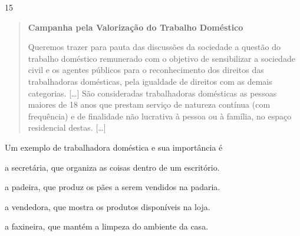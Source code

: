 
\num{15}

\begin{quote}
\textbf{Campanha pela Valorização do Trabalho Doméstico}

Queremos trazer para pauta das discussões da sociedade a questão do
trabalho doméstico remunerado com o objetivo de sensibilizar a sociedade
civil e os agentes públicos para o reconhecimento dos direitos das
trabalhadoras domésticas, pela igualdade de direitos com as demais
categorias. {[}\ldots{}{]}
São consideradas trabalhadoras domésticas as pessoas maiores
de 18 anos que prestam serviço de natureza contínua (com frequência) e
de finalidade não lucrativa à pessoa ou à família, no espaço residencial
destas. {[}\ldots{}{]}

\end{quote}

\noindent{}Um exemplo de trabalhadora doméstica e sua importância é

\begin{escolha}
\item a secretária, que organiza as coisas dentro de um escritório.

\item a padeira, que produz os pães a serem vendidos na padaria.

\item a vendedora, que mostra os produtos disponíveis na loja.

\item a faxineira, que mantém a limpeza do ambiente da casa.
\end{escolha}


